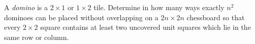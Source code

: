 A \emph{domino} is a $2 \times 1$ or $1 \times  2$ tile. Determine in how many ways exactly $n^2$ dominoes can be placed without overlapping on a $2n \times  2n$ chessboard so that every $2 \times  2$ square contains at least two uncovered unit squares which lie in the same row or column.
